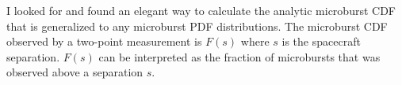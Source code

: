 \documentclass[12pt]{article}
\begin{document}
\maketitle

I looked for and found an elegant way to calculate the analytic microburst CDF that is generalized to any microburst PDF distributions. The microburst CDF observed by a two-point measurement is $F(s)$ where $s$ is the spacecraft separation. $F(s)$ can be interpreted as the fraction of microbursts that was observed above a separation $s$.
\end{document}
